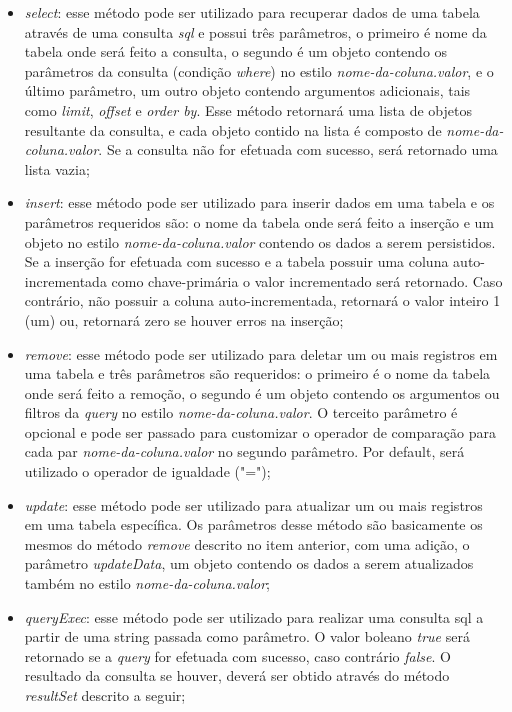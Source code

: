 \begin{itemize}
	\item \textit{select}: esse método pode ser utilizado para recuperar dados de uma tabela através de uma consulta \textit{sql} e possui três parâmetros, o primeiro é nome da tabela onde será feito a consulta, o segundo é um objeto contendo os parâmetros da consulta (condição \textit{where}) no estilo \textit{nome-da-coluna.valor}, e o último parâmetro, um outro objeto contendo argumentos adicionais, tais como \textit{limit}, \textit{offset} e \textit{order by}. Esse método retornará uma lista de objetos resultante da consulta, e cada objeto contido na lista é composto de \textit{nome-da-coluna.valor}. Se a consulta não for efetuada com sucesso, será retornado uma lista vazia;

	\item \textit{insert}: esse método pode ser utilizado para inserir dados em uma tabela e os parâmetros requeridos são: o nome da tabela onde será feito a inserção e um objeto no estilo \textit{nome-da-coluna.valor} contendo os dados a serem persistidos. Se a inserção for efetuada com sucesso e a tabela possuir uma coluna auto-incrementada como chave-primária o valor incrementado será retornado. Caso contrário, não possuir a coluna auto-incrementada, retornará o valor inteiro 1 (um) ou, retornará zero se houver erros na inserção;

	\item \textit{remove}: esse método pode ser utilizado para deletar um ou mais registros em uma tabela e três parâmetros são requeridos: o primeiro é o nome da tabela onde será feito a remoção, o segundo é um objeto contendo os argumentos ou filtros da \textit{query} no estilo \textit{nome-da-coluna.valor}. O terceito parâmetro é opcional e pode ser passado para customizar o operador de comparação para cada par \textit{nome-da-coluna.valor} no segundo parâmetro. Por default, será utilizado o operador de igualdade ("=");

	\item \textit{update}: esse método pode ser utilizado para atualizar um ou mais registros em uma tabela específica. Os parâmetros desse método são basicamente os mesmos do método \textit{remove} descrito no item anterior, com uma adição, o parâmetro \textit{updateData}, um objeto contendo os dados a serem atualizados também no estilo \textit{nome-da-coluna.valor};

	\item \textit{queryExec}: esse método pode ser utilizado para realizar uma consulta sql a partir de uma string passada como parâmetro. O valor boleano \textit{true} será retornado se a \textit{query} for efetuada com sucesso, caso contrário \textit{false}. O resultado da consulta se houver, deverá ser obtido através do método \textit{resultSet} descrito a seguir;


\end{itemize}
